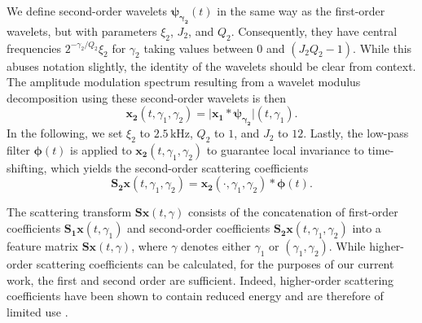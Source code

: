 \documentclass[smallextended]{svjour3}
\begin{document}
We define second-order wavelets $\boldsymbol{\psi_{\gamma_2}}(t)$ in the same way as the first-order wavelets, but with parameters $\xi_2$, $J_2$, and $Q_2$. Consequently, they have central frequencies $2^{-\gamma_2/Q_2}\xi_2$ for $\gamma_2$ taking values between $0$ and $(J_2 Q_2 - 1)$. While this abuses notation slightly, the identity of the wavelets should be clear from context.
The amplitude modulation spectrum resulting from a wavelet modulus decomposition using these second-order wavelets is then
\begin{equation}
\boldsymbol{x_2}(t,\gamma_1,\gamma_2) =
\vert \boldsymbol{x_1} \ast \boldsymbol{\psi_{\gamma_2}} \vert(t,\gamma_1).
\end{equation}
In the following, we set $\xi_2$ to $2.5\,\mathrm{kHz}$, $Q_2$ to $1$, and $J_2$ to $12$. Lastly, the low-pass filter $\boldsymbol{\phi}(t)$ is applied to $\boldsymbol{x_2}(t, \gamma_1, \gamma_2)$ to guarantee local invariance to time-shifting, which yields the second-order scattering coefficients
\begin{equation}
\mathbf{S_2}\boldsymbol{x}(t,\gamma_1,\gamma_2) =
\boldsymbol{x_2}(\cdot,\gamma_1,\gamma_2) \ast \boldsymbol{\phi}(t).
\end{equation}

The scattering transform $\mathbf{S}\boldsymbol{x}(t,\gamma)$ consists of the concatenation of first-order coefficients $\mathbf{S_1}\boldsymbol{x}(t,\gamma_1)$ and second-order coefficients $\mathbf{S_2}\boldsymbol{x}(t,\gamma_1,\gamma_2)$ into a feature matrix $\mathbf{S}\boldsymbol{x}(t,\gamma)$, where $\gamma$ denotes either $\gamma_1$ or $(\gamma_1,\gamma_2)$. While higher-order scattering coefficients can be calculated, for the purposes of our current work, the first and second order are sufficient.
Indeed, higher-order scattering coefficients have been shown to contain reduced energy and are therefore of limited use \cite{irene}.
\end{document}
